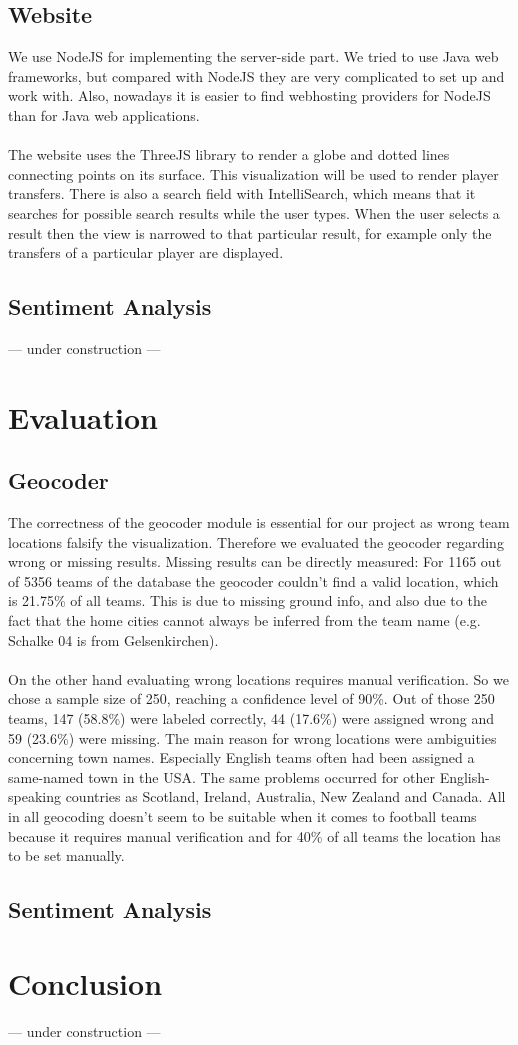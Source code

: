 \documentclass{article}
\begin{document}
\subsection{Website}

We use NodeJS \cite{NodeJS} for implementing the server-side part. We tried to use Java web frameworks, but compared with NodeJS they are very complicated to set up and work with. Also, nowadays it is easier to find webhosting providers for NodeJS than for Java web applications.
\\ \\
The website uses the ThreeJS library \cite{ThreeJS} to render a globe and dotted lines connecting points on its surface. This visualization will be used to render player transfers. There is also a search field with IntelliSearch, which means that it searches for possible search results while the user types. When the user selects a result then the view is narrowed to that particular result, for example only the transfers of a particular player are displayed.

\subsection{Sentiment Analysis}
--- under construction ---

\section{Evaluation}
\subsection{Geocoder}
The correctness of the geocoder module is essential for our project as wrong team locations falsify the visualization. Therefore we evaluated the geocoder regarding wrong or missing results. Missing results can be directly measured: For 1165 out of 5356 teams of the database the geocoder couldn't find a valid location, which is 21.75\% of all teams. This is due to missing ground info, and also due to the fact that the home cities cannot always be inferred from the team name (e.g. Schalke 04 is from Gelsenkirchen). 
\\ \\
On the other hand evaluating wrong locations requires manual verification. So we chose a sample size of 250, reaching a confidence level of 90\%. Out of those 250 teams, 147 (58.8\%) were labeled correctly, 44 (17.6\%) were assigned wrong and 59 (23.6\%) were missing. The main reason for wrong locations were ambiguities concerning town names. Especially English teams often had been assigned a same-named town in the USA. The same problems occurred for other English-speaking countries as Scotland, Ireland, Australia, New Zealand and Canada. All in all geocoding doesn't seem to be suitable when it comes to football teams because it requires manual verification and for 40\% of all teams the location has to be set manually.


\subsection{Sentiment Analysis}

\section{Conclusion}
--- under construction ---


\end{document}
